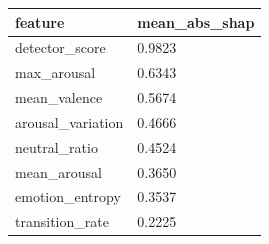 \begin{tabular}{ll}
\toprule
feature & mean\_abs\_shap \\
\midrule
detector\_score & 0.9823 \\
max\_arousal & 0.6343 \\
mean\_valence & 0.5674 \\
arousal\_variation & 0.4666 \\
neutral\_ratio & 0.4524 \\
mean\_arousal & 0.3650 \\
emotion\_entropy & 0.3537 \\
transition\_rate & 0.2225 \\
\bottomrule
\end{tabular}
